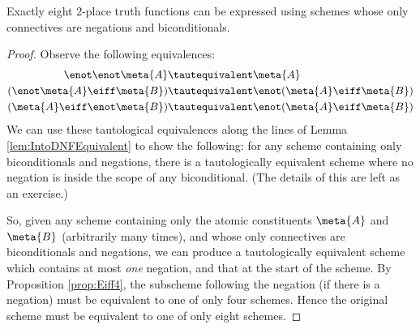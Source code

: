 	\begin{prop}\label{prop:NotExpressiveNotBi}
	Exactly eight 2-place truth functions can be expressed using schemes whose only connectives are negations and biconditionals.
	\begin{proof}
		Observe the following equivalences:
			\begin{align*}
				\enot \enot\meta{A} & \tautequivalent \meta{A}\\
				(\enot \meta{A} \eiff \meta{B}) & \tautequivalent \enot(\meta{A} \eiff \meta{B}) \\
				(\meta{A} \eiff \enot \meta{B}) & \tautequivalent \enot(\meta{A} \eiff \meta{B}) 
			\end{align*}
		We can use these tautological equivalences along the lines of Lemma \ref{lem:IntoDNFEquivalent} to show the following: for any scheme containing only biconditionals and negations, there is a tautologically equivalent scheme where no negation is inside the scope of any biconditional. (The details of this are left as an exercise.)
		
		So, given any scheme containing only the atomic constituents $\meta{A}$ and $\meta{B}$ (arbitrarily many times), and whose only connectives are biconditionals and negations, we can produce a tautologically equivalent scheme which contains at most \emph{one} negation, and that at the start of the scheme.  By Proposition \ref{prop:Eiff4}, the subscheme following the negation (if there is a negation) must be equivalent to one of only four schemes. Hence the original scheme must be equivalent to one of only eight schemes.
	\end{proof}
\end{prop}







